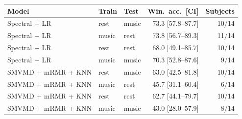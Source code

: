 \small
\begin{tabular}{lllrr}
\hline
Model & Train & Test & Win.\ acc.\ [CI] & Subjects \\
\hline
Spectral + LR & rest & music & 73.3 [57.8--87.7] & 10/14 \\
Spectral + LR & music & rest & 73.8 [56.7--89.3] & 11/14 \\
Spectral + LR & rest & rest & 68.0 [49.1--85.7] & 10/14 \\
Spectral + LR & music & music & 70.3 [52.8--87.6] & 9/14 \\
SMVMD + mRMR + KNN & rest & music & 63.0 [42.5--81.8] & 10/14 \\
SMVMD + mRMR + KNN & music & rest & 45.7 [31.1--60.4] & 6/14 \\
SMVMD + mRMR + KNN & rest & rest & 62.7 [44.1--79.7] & 10/14 \\
SMVMD + mRMR + KNN & music & music & 43.0 [28.0--57.9] & 8/14 \\
\hline
\end{tabular}
